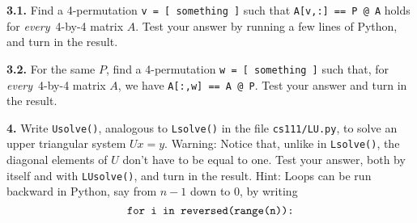 \documentclass[11pt]{article}
\begin{document}
\par\medskip
{\bf 3.1.}
Find a 4-permutation {\tt v = [ something ]}
such that {\tt A[v,:] == P @ A} holds for
{\em every}\, 4-by-4 matrix $A$.
Test your answer by running a few lines of Python, 
and turn in the result.

\par\medskip
{\bf 3.2.} For the same $P$, 
find a 4-permutation {\tt w = [ something ]}
such that, for {\em every}\, 4-by-4 matrix $A$, 
we have {\tt A[:,w] == A @ P}. 
Test your answer and turn in the result.

\par\bigskip
{\bf 4.}
Write {\tt Usolve()}, analogous to {\tt Lsolve()} in 
the file {\tt cs111/LU.py},
to solve an upper triangular system $Ux=y$. 
Warning: Notice that, unlike in {\tt Lsolve()}, 
the diagonal elements of $U$ don't have to be equal to one.
Test your answer, both by itself and with {\tt LUsolve()},
and turn in the result.
Hint: Loops can be run backward in Python, 
say from $n-1$ down to $0$, by writing
$$\mbox{\tt for i in reversed(range(n)):}$$
\end{document}
